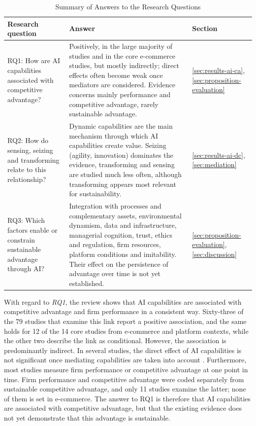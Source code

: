 \begin{table}[H]
  \centering
  \caption{Summary of Answers to the Research Questions}
  \label{tab:rq-answers}
  \small{}\sloppy
  \begin{tabularx}{\textwidth}{>{\raggedright\arraybackslash}p{3.4cm}>{\raggedright\arraybackslash}X>{\raggedright\arraybackslash}p{1.8cm}}
    \toprule
    \textbf{Research question} & \textbf{Answer} & \textbf{Section} \\
    \midrule
    RQ1: How are AI capabilities associated with competitive advantage? & Positively, in the large majority of studies and in the core e-commerce studies, but mostly indirectly; direct effects often become weak once mediators are considered. Evidence concerns mainly performance and competitive advantage, rarely sustainable advantage. & \ref{sec:results-ai-ca}, \ref{sec:proposition-evaluation} \\
    \addlinespace
    RQ2: How do sensing, seizing and transforming relate to this relationship? & Dynamic capabilities are the main mechanism through which AI capabilities create value. Seizing (agility, innovation) dominates the evidence, transforming and sensing are studied much less often, although transforming appears most relevant for sustainability. & \ref{sec:results-ai-dc}, \ref{sec:mediation} \\
    \addlinespace
    RQ3: Which factors enable or constrain sustainable advantage through AI? & Integration with processes and complementary assets, environmental dynamism, data and infrastructure, managerial cognition, trust, ethics and regulation, firm resources, platform conditions and imitability. Their effect on the persistence of advantage over time is not yet established. & \ref{sec:proposition-evaluation}, \ref{sec:discussion} \\
    \bottomrule
  \end{tabularx}
\end{table}

With regard to \emph{RQ1}, the review shows that AI capabilities are associated with competitive advantage and firm performance in a consistent way. Sixty-three of the 79 studies that examine this link report a positive association, and the same holds for 12 of the 14 core studies from e-commerce and platform contexts, while the other two describe the link as conditional. However, the association is predominantly indirect. In several studies, the direct effect of AI capabilities is not significant once mediating capabilities are taken into account \parencites[1]{slrR003}[1]{slrR011}[1]{wang2026}[1]{slrR120}[1]{slrR059}. Furthermore, most studies measure firm performance or competitive advantage at one point in time. Firm performance and competitive advantage were coded separately from sustainable competitive advantage, and only 11 studies examine the latter; none of them is set in e-commerce. The answer to RQ1 is therefore that AI capabilities are associated with competitive advantage, but that the existing evidence does not yet demonstrate that this advantage is sustainable.

